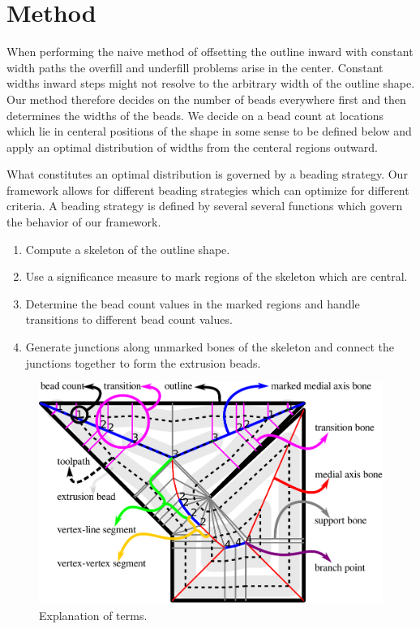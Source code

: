 \section{Method}
When performing the naive method of offsetting the outline inward with constant width paths the overfill and underfill problems arise in the center.
Constant widths inward steps might not resolve to the arbitrary width of the outline shape.
Our method therefore decides on the number of beads everywhere first and then determines the widths of the beads.
We decide on a bead count at locations which lie in centeral positions of the shape in some sense to be defined below and apply an optimal distribution of widths from the centeral regions outward.

What constitutes an optimal distribution is governed by a beading strategy.
Our framework allows for different beading strategies which can optimize for different criteria.
A beading strategy is defined by several several functions which govern the behavior of our framework.

\begin{enumerate}
\item Compute a skeleton of the outline shape.
\item Use a significance measure to mark regions of the skeleton which are central.
\item Determine the bead count values in the marked regions and handle transitions to different bead count values.
\item Generate junctions along unmarked bones of the skeleton and connect the junctions together to form the extrusion beads.
\end{enumerate}


\begin{figure}
\includegraphics[width=\columnwidth]{sources/method/terminology.pdf}
\caption{Explanation of terms.}
\label{legend}
\end{figure}


















